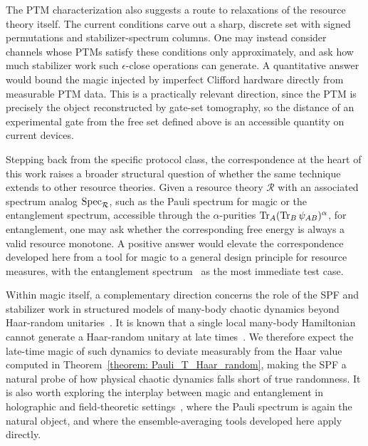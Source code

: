 \documentclass[aps,pra,superscriptaddress,twocolumn,longbibliography]{revtex4-2}
\newcommand{\tr}{{\rm Tr}}
\def\mO{\mathcal{O}}
\begin{document}
The PTM characterization also suggests a route to relaxations of the resource theory itself.
The current conditions carve out a sharp, discrete set with signed permutations and stabilizer-spectrum columns.
One may instead consider channels whose PTMs satisfy these conditions only approximately, %
and ask how much stabilizer work such $\epsilon$-close operations can generate.
A quantitative answer would bound the magic injected by imperfect Clifford hardware directly from measurable PTM data. This is a practically relevant direction, since the PTM is precisely the object reconstructed by gate-set tomography, so the distance of an experimental gate from the free set defined above is an accessible quantity on current devices.

Stepping back from the specific protocol class, the correspondence at the heart of this work raises a broader structural question of whether the same technique extends to other resource theories.
Given a resource theory $\mathcal{R}$ with an associated spectrum analog ${\rm Spec}_{\mathcal{R}}$, such as the Pauli spectrum for magic or the entanglement spectrum, accessible through the $\alpha$-purities $\tr_{A}(\tr_{B}\,\psi_{AB})^{\alpha}$, for entanglement, one may ask whether the corresponding free energy is always a valid resource monotone. 
A positive answer would elevate the correspondence developed here from a tool for magic to a general design principle for resource measures, with the entanglement spectrum~\cite{Li_Haldane/Entanglement_Spectrum/2008} as the most immediate test case.

Within magic itself, a complementary direction concerns the role of the SPF and stabilizer work in structured models of many-body chaotic dynamics beyond Haar-random unitaries~\cite{WES/C_ensemble/2025}. It is known that a single local many-body Hamiltonian cannot generate a Haar-random unitary at late times~\cite{Roberts/chaos_design/2017}.
We therefore expect the late-time magic of such dynamics to deviate measurably from the Haar value computed in Theorem~\ref{theorem: Pauli_T_Haar_random}, making the SPF a natural probe of how physical chaotic dynamics falls short of true randomness. 
It is also worth exploring the interplay between magic and entanglement in holographic and field-theoretic settings~\cite{White/magicalCFT/2021,  Cao/magic_gravity/2025}, where the Pauli spectrum is again the natural object, and where the ensemble-averaging tools developed here apply directly.
\end{document}
